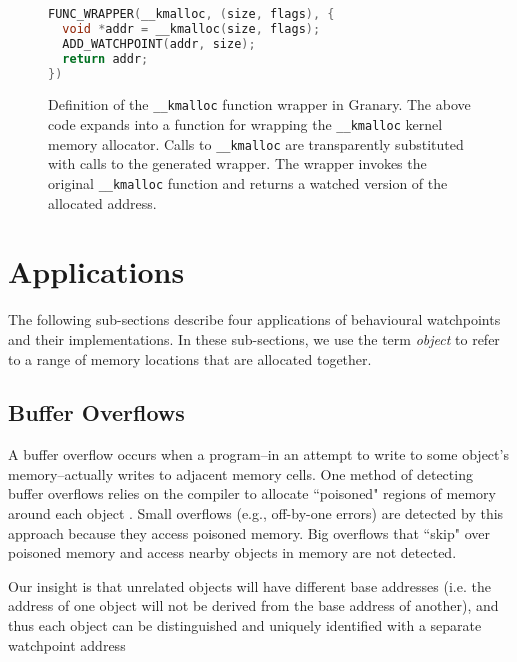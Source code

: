 \documentclass[letterpaper,twocolumn,10pt]{article}
\let\ORIGcaption\caption
\renewcommand{\caption}[2][\compressedcaption]{%
\def\compressedcaption{#2}%
    \vspace{-12pt}%
    \ORIGcaption[#1]{#2}%
    \vspace{-12pt}}
\begin{document}
\begin{figure}
\begin{lstlisting}[language=C,basicstyle=\footnotesize\ttfamily]
FUNC_WRAPPER(__kmalloc, (size, flags), {
  void *addr = __kmalloc(size, flags);
  ADD_WATCHPOINT(addr, size);
  return addr;
})
\end{lstlisting}
\caption{\label{fig:kmalloc_wrapper}Definition of the \texttt{\_\_kmalloc} function wrapper in Granary. The above code expands into a function for wrapping the \texttt{\_\_kmalloc} kernel memory allocator. Calls to \texttt{\_\_kmalloc} are transparently substituted with calls to the generated wrapper. The wrapper invokes the original \texttt{\_\_kmalloc} function and returns a watched version of the allocated address.}
\end{figure}

\section{Applications\label{sec:applications}}
The following sub-sections describe four applications of behavioural watchpoints and their implementations. In these sub-sections, we use the term \emph{object} to refer to a range of memory locations that are allocated together.%


\subsection{Buffer Overflows \label{sec:buffer_overflows}}
A buffer overflow occurs when a program--in an attempt to write to some object's memory--actually writes to adjacent memory cells. One method of detecting buffer overflows relies on the compiler to allocate ``poisoned" regions of memory around each object \cite{AddressSanitizer}. Small overflows (e.g., off-by-one errors) are detected by this approach because they access poisoned memory. Big overflows that ``skip" over poisoned memory and access nearby objects in memory are not detected.

Our insight is that unrelated objects will have different base addresses (i.e. the address of one object will not be derived from the base %
address of another), and thus each object can be distinguished and uniquely identified with a separate watchpoint address%
\end{document}
